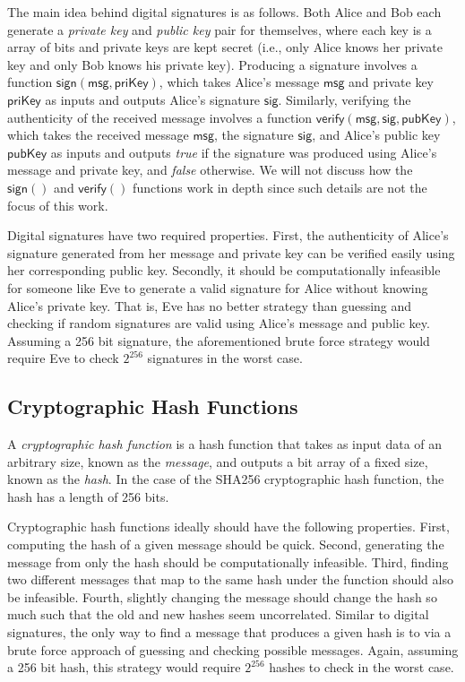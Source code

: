 \documentclass{article}
\begin{document}
The main idea behind digital signatures is as follows. Both Alice and Bob each
generate a \emph{private key} and \emph{public key} pair for themselves, where
each key is a array of bits and private keys are kept secret (i.e., only Alice
knows her private key and only Bob knows his private key). Producing a signature
involves a function $\mathsf{sign(msg, priKey)}$, which takes Alice's message
$\mathsf{msg}$ and private key $\mathsf{priKey}$ as inputs and outputs Alice's
signature $\mathsf{sig}$. Similarly, verifying the authenticity of the received
message involves a function $\mathsf{verify(msg, sig, pubKey)}$, which takes the
received message $\mathsf{msg}$, the signature $\mathsf{sig}$, and Alice's
public key $\mathsf{pubKey}$ as inputs and outputs \emph{true} if the signature
was produced using Alice's message and private key, and \emph{false} otherwise.
We will not discuss how the $\mathsf{sign()}$ and $\mathsf{verify()}$ functions
work in depth since such details are not the focus of this work.

Digital signatures have two required properties. First, the authenticity of
Alice's signature generated from her message and private key can be verified
easily using her corresponding public key. Secondly, it should be
computationally infeasible for someone like Eve to generate a valid signature
for Alice without knowing Alice's private key. That is, Eve has no better
strategy than guessing and checking if random signatures are valid using Alice's
message and public key. Assuming a 256 bit signature, the aforementioned brute
force strategy would require Eve to check $2^{256}$ signatures in the worst
case.

\subsection{Cryptographic Hash Functions}

A \emph{cryptographic hash function} is a hash function that takes as input data
of an arbitrary size, known as the \emph{message}, and outputs a bit array of a
fixed size, known as the \emph{hash}. In the case of the SHA256 cryptographic
hash function, the hash has a length of 256 bits.

Cryptographic hash functions ideally should have the following properties.
First, computing the hash of a given message should be quick. Second, generating
the message from only the hash should be computationally infeasible. Third,
finding two different messages that map to the same hash under the function
should also be infeasible. Fourth, slightly changing the message should change
the hash so much such that the old and new hashes seem uncorrelated. Similar to
digital signatures, the only way to find a message that produces a given hash is
to via a brute force approach of guessing and checking possible messages. Again,
assuming a 256 bit hash, this strategy would require $2^{256}$ hashes to check
in the worst case.
\end{document}
